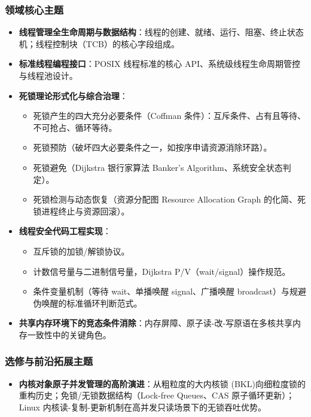 \subsubsection{领域核心主题}
\begin{itemize}\setlength{\itemsep}{0pt}\setlength{\parskip}{0pt}
    \item \textbf{线程管理全生命周期与数据结构}：线程的创建、就绪、运行、阻塞、终止状态机；线程控制块（TCB）的核心字段组成。
    \item \textbf{标准线程编程接口}：POSIX 线程标准的核心 API、系统级线程生命周期管控与线程池设计。
    \item \textbf{死锁理论形式化与综合治理}：
    \begin{itemize}\setlength{\itemsep}{0pt}\setlength{\parskip}{0pt}
        \item 死锁产生的四大充分必要条件（Coffman 条件）：互斥条件、占有且等待、不可抢占、循环等待。
        \item 死锁预防（破坏四大必要条件之一，如按序申请资源消除环路）。
        \item 死锁避免（Dijkstra 银行家算法 Banker's Algorithm、系统安全状态判定）。
        \item 死锁检测与动态恢复（资源分配图 Resource Allocation Graph 的化简、死锁进程终止与资源回滚）。
    \end{itemize}
    \item \textbf{线程安全代码工程实现}：
    \begin{itemize}\setlength{\itemsep}{0pt}\setlength{\parskip}{0pt}
        \item 互斥锁的加锁/解锁协议。
        \item 计数信号量与二进制信号量，Dijkstra P/V（wait/signal）操作规范。
        \item 条件变量机制（等待 wait、单播唤醒 signal、广播唤醒 broadcast）与规避伪唤醒的标准循环判断范式。
    \end{itemize}
    \item \textbf{共享内存环境下的竞态条件消除}：内存屏障、原子读-改-写原语在多核共享内存一致性中的关键角色。
\end{itemize}

\subsubsection{选修与前沿拓展主题}
\begin{itemize}\setlength{\itemsep}{0pt}\setlength{\parskip}{0pt}
    \item \textbf{内核对象原子并发管理的高阶演进}：从粗粒度的大内核锁 (BKL)向细粒度锁的重构历史；免锁/无锁数据结构（Lock-free Queues、CAS 原子循环更新）；Linux 内核读-复制-更新机制在高并发只读场景下的无锁吞吐优势。
\end{itemize}

